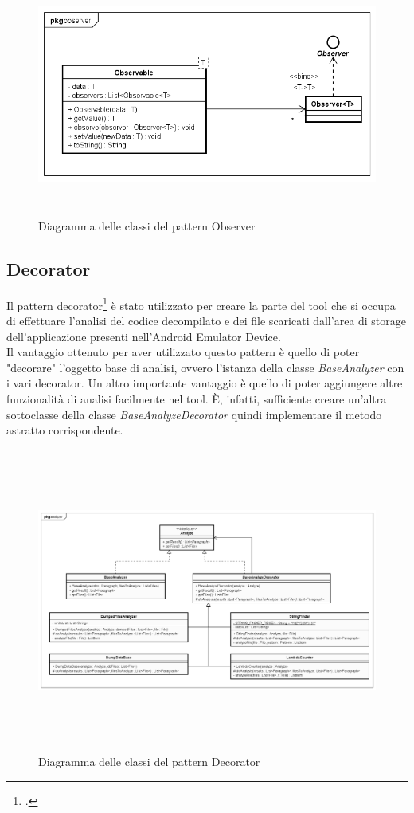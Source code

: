 \begin{figure}[H]
    \centering
    \includegraphics[width=14cm, height=8cm]{./immagini/diagrammi_uml/Observer.png}
    \caption{Diagramma delle classi del pattern Observer}\label{fig:observer}
\end{figure}

\newpage
\subsection{Decorator}\label{subsec:decorator}
Il pattern decorator\footcite{womak:decorator} è stato utilizzato per creare la parte del tool che si occupa
di effettuare l'analisi del codice decompilato e dei file scaricati dall'area di storage
dell'applicazione presenti nell'Android Emulator Device.\\
Il vantaggio ottenuto per aver utilizzato questo pattern è quello di poter "decorare" l'oggetto base di analisi, ovvero l'istanza della classe \textit{BaseAnalyzer} con i vari decorator.
Un altro importante vantaggio è quello di poter aggiungere altre funzionalità
di analisi facilmente nel tool.
È, infatti, sufficiente creare un'altra sottoclasse della classe \textit{BaseAnalyzeDecorator} quindi implementare il metodo astratto corrispondente.

\begin{figure}[H]
    \centering
    \includegraphics[width=14cm, height=10cm]{./immagini/diagrammi_uml/Decorator.png}
    \caption{Diagramma delle classi del pattern Decorator}\label{fig:decorator}
\end{figure}

